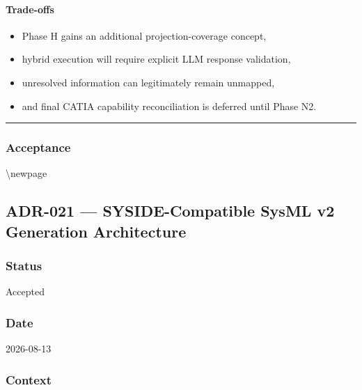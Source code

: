 \hypertarget{trade-offs-2}{%
\paragraph{Trade-offs}\label{trade-offs-2}}

\begin{itemize}
\tightlist
\item
  Phase H gains an additional projection-coverage concept,
\item
  hybrid execution will require explicit LLM response validation,
\item
  unresolved information can legitimately remain unmapped,
\item
  and final CATIA capability reconciliation is deferred until Phase N2.
\end{itemize}

\begin{center}\rule{0.5\linewidth}{0.5pt}\end{center}

\hypertarget{acceptance-1}{%
\subsubsection{Acceptance}\label{acceptance-1}}

\textbackslash newpage

\hypertarget{adr-021--syside-compatible-sysml-v2-generation-architecture}{%
\subsection{ADR-021 --- SYSIDE-Compatible SysML v2 Generation Architecture}\label{adr-021--syside-compatible-sysml-v2-generation-architecture}}

\hypertarget{status-3}{%
\subsubsection{Status}\label{status-3}}

Accepted

\hypertarget{date-3}{%
\subsubsection{Date}\label{date-3}}

2026-08-13

\hypertarget{context-6}{%
\subsubsection{Context}\label{context-6}}

